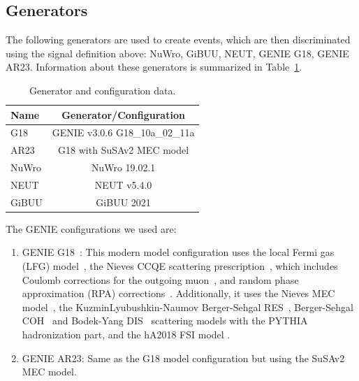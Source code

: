\documentclass{article}
\begin{document}
\subsection{Generators}

The following generators are used to create events, which are then discriminated using the signal definition above: NuWro, GiBUU, NEUT, GENIE G18, GENIE AR23.
Information about these generators is summarized in Table~\ref{table:generator-data}.

\begin{table}[H]
    \begin{center}
        \begin{tabular}{lc}
        \hline
        \textbf{Name} & \textbf{Generator/Configuration} \\ \hline
        G18 & GENIE v3.0.6 G18\_10a\_02\_11a \\
        AR23 & G18 with SuSAv2 MEC model \\
        NuWro & NuWro 19.02.1 \\
        NEUT & NEUT v5.4.0 \\
        GiBUU & GiBUU 2021 \\ \hline
        \end{tabular}
    \end{center}
    \caption{Generator and configuration data.}
    \label{table:generator-data}
\end{table}

The GENIE configurations we used are:
\begin{enumerate}[label=(\roman*)]
    \item GENIE G18~\cite{ANDREOPOULOS201087,andreopoulos2015genieneutrinomontecarlo}: This modern model configuration uses the local Fermi gas (LFG) model~\cite{CARRASCO1992445}, 
    the Nieves CCQE scattering prescription~\cite{PhysRevD.85.113008}, which includes Coulomb corrections for the outgoing 
    muon~\cite{PhysRevC.57.2004}, and random phase approximation (RPA) corrections~\cite{PhysRevC.70.055503}. Additionally, it uses the Nieves
    MEC model~\cite{schwehr2017genieimplementationificvalencia}, the KuzminLyubushkin-Naumov Berger-Sehgal RES~\cite{PhysRevD.76.113004,PhysRevD.104.072009,doi:10.1142/S0217732304016172}, Berger-Sehgal COH~\cite{PhysRevD.79.053003} and 
    Bodek-Yang DIS~\cite{PhysRevLett.82.2467} scattering models with the PYTHIA~\cite{Sjostrand_2006} hadronization part, and the hA2018 FSI model \cite{PhysRevC.23.2173}.
    \item GENIE AR23: Same as the G18 model configuration but using the SuSAv2 MEC model.
\end{enumerate}
\end{document}
